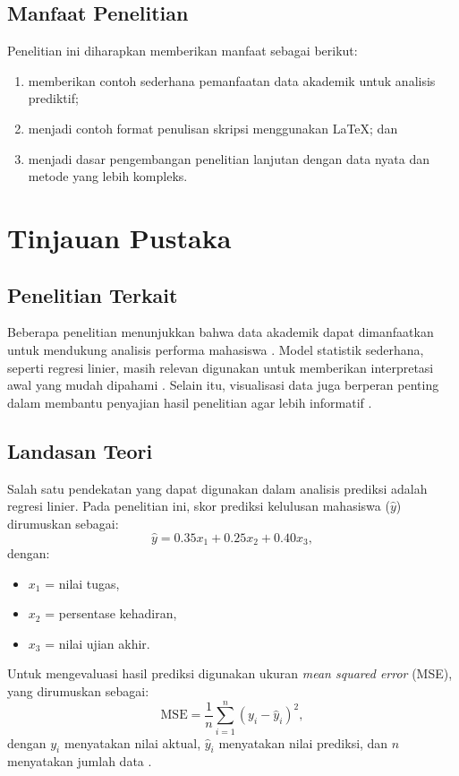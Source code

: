 \documentclass[skripsi]{unnes-ta_plus}
\begin{document}
\section{Manfaat Penelitian}
Penelitian ini diharapkan memberikan manfaat sebagai berikut:
\begin{enumerate}
    \item memberikan contoh sederhana pemanfaatan data akademik untuk analisis prediktif;
    \item menjadi contoh format penulisan skripsi menggunakan \LaTeX; dan
    \item menjadi dasar pengembangan penelitian lanjutan dengan data nyata dan metode yang lebih kompleks.
\end{enumerate}

\chapter{Tinjauan Pustaka}

\section{Penelitian Terkait}
Beberapa penelitian menunjukkan bahwa data akademik dapat dimanfaatkan untuk mendukung analisis performa mahasiswa \cite{ahmad2022}. Model statistik sederhana, seperti regresi linier, masih relevan digunakan untuk memberikan interpretasi awal yang mudah dipahami \cite{pratama2023}. Selain itu, visualisasi data juga berperan penting dalam membantu penyajian hasil penelitian agar lebih informatif \cite{santoso2021}.

\section{Landasan Teori}
Salah satu pendekatan yang dapat digunakan dalam analisis prediksi adalah regresi linier. Pada penelitian ini, skor prediksi kelulusan mahasiswa ($\hat{y}$) dirumuskan sebagai:
\begin{equation}
\hat{y} = 0.35x_1 + 0.25x_2 + 0.40x_3,
\end{equation}
dengan:
\begin{itemize}
    \item $x_1$ = nilai tugas,
    \item $x_2$ = persentase kehadiran,
    \item $x_3$ = nilai ujian akhir.
\end{itemize}

Untuk mengevaluasi hasil prediksi digunakan ukuran \textit{mean squared error} (MSE), yang dirumuskan sebagai:
\begin{equation}
\mathrm{MSE} = \frac{1}{n}\sum_{i=1}^{n}(y_i - \hat{y}_i)^2,
\end{equation}
dengan $y_i$ menyatakan nilai aktual, $\hat{y}_i$ menyatakan nilai prediksi, dan $n$ menyatakan jumlah data \cite{pratama2023}.
\end{document}
